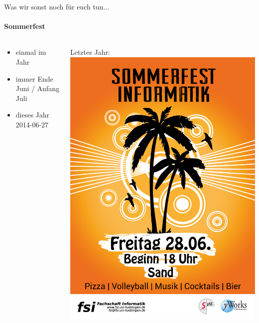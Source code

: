 \documentclass{beamer}
\begin{document}
	\begin{frame}{Was wir sonst noch für euch tun...}
	\framesubtitle{Sommerfest}
		\begin{columns}
			\begin{column}{.5\linewidth}
				\begin{itemize}
					\item einmal im Jahr
					\item immer Ende Juni / Anfang Juli
					\item dieses Jahr 2014-06-27
				\end{itemize}
			\end{column}
			\begin{column}{.5\linewidth}
				Letztes Jahr:\vspace*{2mm}\\
				\includegraphics[width=\linewidth]{sf13.png}
			\end{column}
		\end{columns}
	\end{frame}
\end{document}
